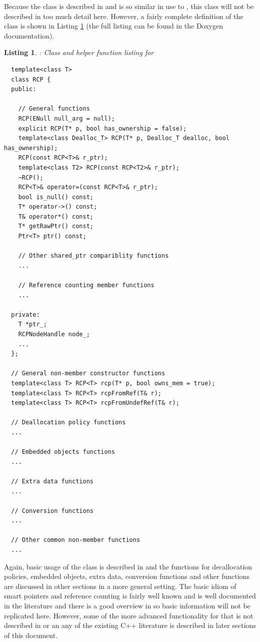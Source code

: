 \documentclass[pdf,ps2pdf,11pt]{SANDreport}
\newtheorem{listing}{Listing}
\begin{document}
Because the class {} is described in
{}\cite{RefCountPtrBeginnersGuide} and is so similar in use to
{}, this class will not be described in too
much detail here.  However, a fairly complete definition of the class
{} is shown in Listing {}\ref{listing:RCP} (the full
listing can be found in the Doxygen documentation).

\begin{listing}: Class and helper function listing for {} \\
\label{listing:RCP}
{\small\begin{verbatim}
  template<class T>
  class RCP {
  public:

    // General functions
    RCP(ENull null_arg = null);
    explicit RCP(T* p, bool has_ownership = false);
    template<class Dealloc_T> RCP(T* p, Dealloc_T dealloc, bool has_ownership);
    RCP(const RCP<T>& r_ptr);
    template<class T2> RCP(const RCP<T2>& r_ptr);
    ~RCP();
    RCP<T>& operator=(const RCP<T>& r_ptr);
    bool is_null() const;
    T* operator->() const;
    T& operator*() const;
    T* getRawPtr() const;
    Ptr<T> ptr() const;
  
    // Other shared_ptr compariblity functions
    ...
  
    // Reference counting member functions
    ...
  
  private:
    T *ptr_;
    RCPNodeHandle node_;
    ...
  };

  // General non-member constructor functions
  template<class T> RCP<T> rcp(T* p, bool owns_mem = true);
  template<class T> RCP<T> rcpFromRef(T& r);
  template<class T> RCP<T> rcpFromUndefRef(T& r);

  // Deallocation policy functions
  ...

  // Embedded objects functions
  ...

  // Extra data functions
  ...
 
  // Conversion functions
  ...

  // Other common non-member functions
  ...

\end{verbatim}}
\end{listing}

Again, basic usage of the {} class is described in
{}\cite{RefCountPtrBeginnersGuide} and the functions for decallocation
policies, embedded objects, extra data, conversion functions and other
functions are discussed in other sections in a more general setting.  The
basic idiom of smart pointers and reference counting is fairly well known and
is well documented in the literature and there is a good overview in
{}\cite{RefCountPtrBeginnersGuide} so basic information will not be replicated
here.  However, some of the more advanced functionality for {} that
is not described in {}\cite{RefCountPtrBeginnersGuide} or an any of the
existing C++ literature is described in later sections of this document.
\end{document}
